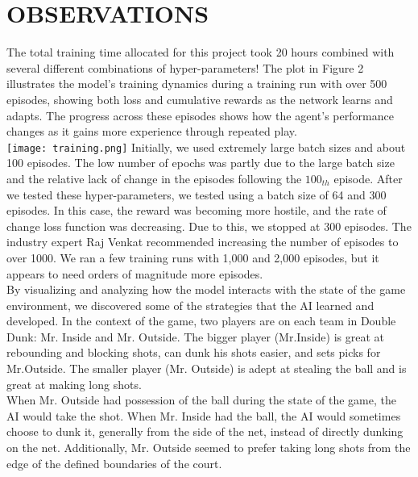 \documentclass[letterpaper, 10 pt, conference]{ieeeconf}
\begin{document}
\vspace{.5cm}
\section{\textbf{OBSERVATIONS}}
\vspace{.5cm}
The total training time allocated for this project took 20 hours combined with several different combinations of hyper-parameters! The plot in Figure 2 illustrates the model's training dynamics during a training run with over 500 episodes, showing both loss and cumulative rewards as the network learns and adapts. The progress across these episodes shows how the agent’s performance changes as it gains more experience through repeated play.\\

    \texttt{[image: training.png]}
    \vspace{.5cm}
Initially, we used extremely large batch sizes and about 100 episodes. The low number of epochs was partly due to the large batch size and the relative lack of change in the episodes following the $100_{th}$ episode. After we tested these hyper-parameters, we tested using a batch size of 64 and 300 episodes. In this case, the reward was becoming more hostile, and the rate of change loss function was decreasing. Due to this, we stopped at 300 episodes. The industry expert Raj Venkat recommended increasing the number of episodes to over 1000. We ran a few training runs with 1,000 and 2,000 episodes, but it appears to need orders of magnitude more episodes.\\

By visualizing and analyzing how the model interacts with the state of the game environment, we discovered some of the strategies that the AI learned and developed. In the context of the game, two players are on each team in Double Dunk: Mr. Inside and Mr. Outside. The bigger player (Mr.Inside) is great at rebounding and blocking shots, can dunk his shots easier, and sets picks for Mr.Outside. The smaller player (Mr. Outside) is adept at stealing the ball and is great at making long shots. \\

When Mr. Outside had possession of the ball during the state of the game, the AI would take the shot. When Mr. Inside had the ball, the AI would sometimes choose to dunk it, generally from the side of the net, instead of directly dunking on the net. Additionally, Mr. Outside seemed to prefer taking long shots from the edge of the defined boundaries of the court. \\
\end{document}
